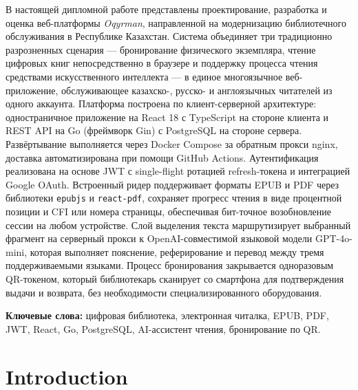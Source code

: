 \documentclass[12pt,a4paper]{report}
\begin{document}
В настоящей дипломной работе представлены проектирование, разработка и
оценка веб-платформы \textit{Oqyrman}, направленной на модернизацию
библиотечного обслуживания в Республике Казахстан. Система объединяет три
традиционно разрозненных сценария --- бронирование физического экземпляра,
чтение цифровых книг непосредственно в браузере и поддержку процесса чтения
средствами искусственного интеллекта --- в единое многоязычное
веб-приложение, обслуживающее казахско-, русско- и англоязычных читателей
из одного аккаунта. Платформа построена по клиент-серверной архитектуре:
одностраничное приложение на React 18 с TypeScript на стороне клиента и
REST API на Go (фреймворк Gin) с PostgreSQL на стороне сервера. Развёртывание
выполняется через Docker Compose за обратным прокси nginx, доставка
автоматизирована при помощи GitHub Actions. Аутентификация реализована на
основе JWT с single-flight ротацией refresh-токена и интеграцией Google
OAuth. Встроенный ридер поддерживает форматы EPUB и PDF через библиотеки
\texttt{epubjs} и \texttt{react-pdf}, сохраняет прогресс чтения в виде
процентной позиции и CFI или номера страницы, обеспечивая бит-точное
возобновление сессии на любом устройстве. Слой выделения текста
маршрутизирует выбранный фрагмент на серверный прокси к OpenAI-совместимой
языковой модели GPT-4o-mini, которая выполняет пояснение, реферирование и
перевод между тремя поддерживаемыми языками. Процесс бронирования
закрывается одноразовым QR-токеном, который библиотекарь сканирует со
смартфона для подтверждения выдачи и возврата, без необходимости
специализированного оборудования.

\textbf{Ключевые слова:} цифровая библиотека, электронная читалка, EPUB, PDF,
JWT, React, Go, PostgreSQL, AI-ассистент чтения, бронирование по QR.


\tableofcontents
\listoffigures
{}
\listoftables
{}

\clearpage
{}

\chapter{Introduction}
\end{document}
